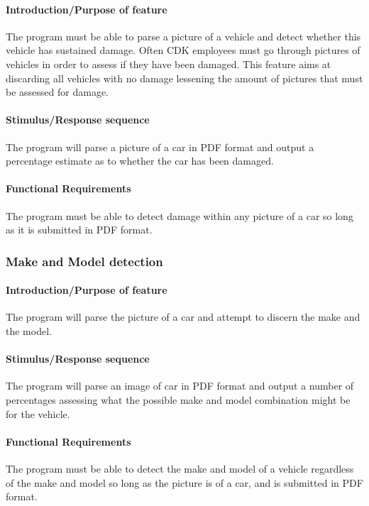 \documentclass[onecolumn, draftclsnofoot,10pt, compsoc]{IEEEtran}
\begin{document}
\hfill\begin{minipage}{\dimexpr\textwidth-1cm}
\paragraph{Introduction/Purpose of feature}
The program must be able to parse a picture of a vehicle and detect whether this vehicle has sustained damage. Often CDK employees must go through pictures of vehicles in order to assess if they have been damaged. This feature aims at discarding all vehicles with no damage lessening the amount of pictures that must be assessed for damage. 
\paragraph{Stimulus/Response sequence}
The program will parse a picture of a car in PDF format and output a percentage estimate as to whether the car has been damaged. 
\paragraph{Functional Requirements}
The program must be able to detect damage within any picture of a car so long as it is submitted in PDF format. 
\end{minipage}
\vspace{.75cm}

\subsubsection{Make and Model detection}\vspace{.5cm}

\hfill\begin{minipage}{\dimexpr\textwidth-1cm}
\paragraph{Introduction/Purpose of feature}
The program will parse the picture of a car and attempt to discern the make and the model.
\paragraph{Stimulus/Response sequence}
The program will parse an image of car in PDF format and output a number of percentages assessing what the possible make and model combination might be for the vehicle. 
\paragraph{Functional Requirements}
The program must be able to detect the make and model of a vehicle regardless of the make and model so long as the picture is of a car, and is submitted in PDF format. 
\end{minipage}
\vspace{.75cm}
\end{document}
